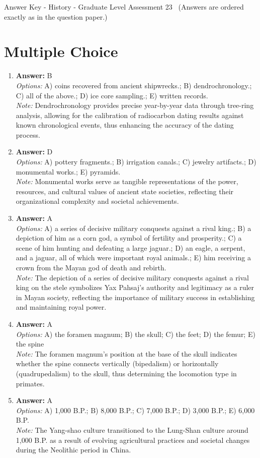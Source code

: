 \documentclass[12pt]{article}
\begin{document}
\begin{center}
Answer Key - History - Graduate Level Assessment 23 \
\small (Answers are ordered exactly as in the question paper.)
\end{center}

\section*{Multiple Choice}
\begin{enumerate}[label=\arabic*.]
\item \textbf{Answer:} B
\\ \textit{Options:} A) coins recovered from ancient shipwrecks.; B) dendrochronology.; C) all of the above.; D) ice core sampling.; E) written records.
\\ \textit{Note:} Dendrochronology provides precise year-by-year data through tree-ring analysis, allowing for the calibration of radiocarbon dating results against known chronological events, thus enhancing the accuracy of the dating process.
\item \textbf{Answer:} D
\\ \textit{Options:} A) pottery fragments.; B) irrigation canals.; C) jewelry artifacts.; D) monumental works.; E) pyramids.
\\ \textit{Note:} Monumental works serve as tangible representations of the power, resources, and cultural values of ancient state societies, reflecting their organizational complexity and societal achievements.
\item \textbf{Answer:} A
\\ \textit{Options:} A) a series of decisive military conquests against a rival king.; B) a depiction of him as a corn god, a symbol of fertility and prosperity.; C) a scene of him hunting and defeating a large jaguar.; D) an eagle, a serpent, and a jaguar, all of which were important royal animals.; E) him receiving a crown from the Mayan god of death and rebirth.
\\ \textit{Note:} The depiction of a series of decisive military conquests against a rival king on the stele symbolizes Yax Pahsaj's authority and legitimacy as a ruler in Mayan society, reflecting the importance of military success in establishing and maintaining royal power.
\item \textbf{Answer:} A
\\ \textit{Options:} A) the foramen magnum; B) the skull; C) the feet; D) the femur; E) the spine
\\ \textit{Note:} The foramen magnum's position at the base of the skull indicates whether the spine connects vertically (bipedalism) or horizontally (quadrupedalism) to the skull, thus determining the locomotion type in primates.
\item \textbf{Answer:} A
\\ \textit{Options:} A) 1,000 B.P.; B) 8,000 B.P.; C) 7,000 B.P.; D) 3,000 B.P.; E) 6,000 B.P.
\\ \textit{Note:} The Yang-shao culture transitioned to the Lung-Shan culture around 1,000 B.P. as a result of evolving agricultural practices and societal changes during the Neolithic period in China.
\end{enumerate}
\end{document}
